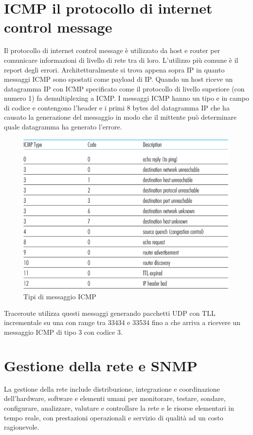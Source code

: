 \section{ICMP il protocollo di internet control message}
Il protocollo di internet control message \`e utilizzato da host e router per comunicare informazioni di livello di rete tra di loro. L'utilizzo pi\`u comune \`e il report degli errori.  Architetturalmente si trova appena
sopra IP in quanto messaggi ICMP sono spostati come payload di IP. Quando un host riceve un datagramma IP con ICMP specificato come il protocollo di livello superiore (con numero 1) fa demultiplexing a 
ICMP. I messaggi ICMP hanno un tipo e in campo di codice e contengono l'header e i primi 8 bytes del datagramma IP che ha causato la generazione del messaggio in modo che il mittente pu\`o determinare
quale datagramma ha generato l'errore.  
\begin{figure}[h]
\includegraphics[width=\textwidth]{Pictures/ICMPValues.png}
\caption{Tipi di messaggio ICMP}
\end{figure}
Traceroute utilizza questi messaggi generando pacchetti UDP con TLL incrementale su una con range tra 33434 e 33534 fino a che arriva a ricevere un messaggio ICMP di tipo 3 con codice 3.
\section{Gestione della rete e SNMP}
La gestione della rete include distribuzione, integrazione e coordinazione dell'hardware, software e elementi umani per monitorare, testare, sondare, configurare, analizzare, valutare e controllare la rete e le
risorse elementari in tempo reale, con prestazioni operazionali e servizio di qualit\`a ad un costo ragionevole. 
